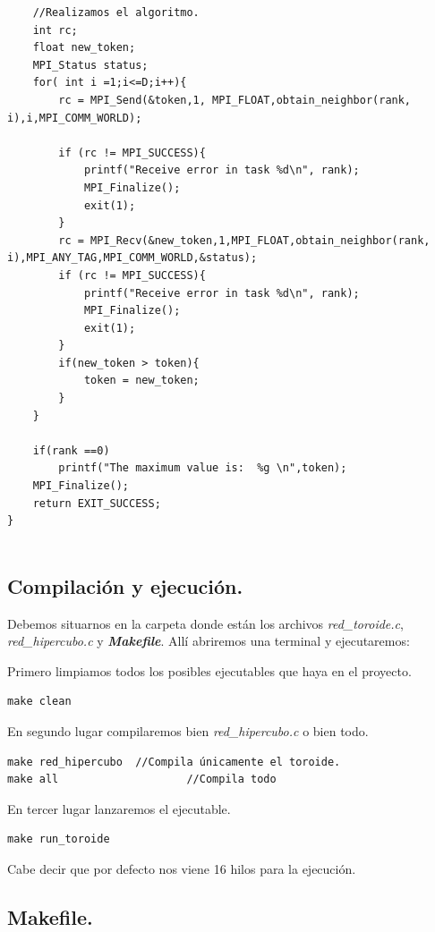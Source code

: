 \documentclass{article}
\begin{document}
\begin{lstlisting}
    //Realizamos el algoritmo.
    int rc;
    float new_token;
    MPI_Status status;
    for( int i =1;i<=D;i++){
        rc = MPI_Send(&token,1, MPI_FLOAT,obtain_neighbor(rank, i),i,MPI_COMM_WORLD);
        
        if (rc != MPI_SUCCESS){
            printf("Receive error in task %d\n", rank);
            MPI_Finalize();
            exit(1);
        }
        rc = MPI_Recv(&new_token,1,MPI_FLOAT,obtain_neighbor(rank, i),MPI_ANY_TAG,MPI_COMM_WORLD,&status);
        if (rc != MPI_SUCCESS){
            printf("Receive error in task %d\n", rank);
            MPI_Finalize();
            exit(1);
        }
        if(new_token > token){
            token = new_token;
        }
    }
    
    if(rank ==0)
        printf("The maximum value is:  %g \n",token);
    MPI_Finalize();
    return EXIT_SUCCESS;
}


\end{lstlisting}
  
\subsection{Compilación y ejecución.}

Debemos situarnos en la carpeta donde están los archivos \textit{red\_toroide.c}, \textit{red\_hipercubo.c} y \textit{\textbf{Makefile}}. Allí abriremos una terminal y ejecutaremos:
\begin{list}{•}{}
\item Primero limpiamos todos los posibles ejecutables que haya en el proyecto.
\begin{lstlisting}
make clean
\end{lstlisting}
\item En segundo lugar compilaremos bien \textit{red\_hipercubo.c} o bien todo.
\begin{lstlisting}
make red_hipercubo	//Compila únicamente el toroide.
make all					//Compila todo
\end{lstlisting}
\item En tercer lugar lanzaremos el ejecutable.
\begin{lstlisting}
make run_toroide
\end{lstlisting}
Cabe decir que por defecto nos viene 16 hilos para la ejecución.
\end{list}

\begin{center}
\section{Makefile.}
\end{center}
\end{document}
